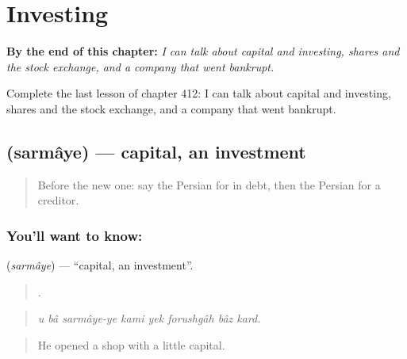 
\chapter{Investing}
\label{ch:fa-investing}

\begin{chapteropening}
\textbf{By the end of this chapter:} \emph{I can talk about capital and investing, shares and the stock exchange, and a company that went bankrupt.}

Complete the last lesson of chapter 412: I can talk about capital and investing, shares and the stock exchange, and a company that went bankrupt.
\end{chapteropening}

\section[\texorpdfstring{\fa{سرمایه} (sarmâye)}{سرمایه (sarmâye)}]{ (sarmâye) — capital, an investment}

\label{lesson:FA-C412-sarmaye}



\begin{quote}
Before the new one: say the Persian for in debt, then the Persian for a creditor.
\end{quote}

\subsection*{You'll want to know: }
\textbf{} (\emph{sarmâye}) — \textquotedblleft{}capital, an investment\textquotedblright{}.

\begin{quote}
       .
\end{quote}

\begin{quote}
\emph{u bâ sarmâye-ye kami yek forushgâh bâz kard.}
\end{quote}

\begin{quote}
He opened a shop with a little capital.
\end{quote}

